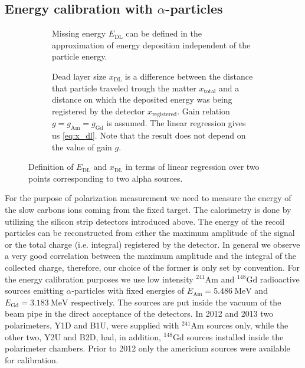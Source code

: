 \documentclass[a4paper,12pt]{article}
\newcommand\americium{${}^{241}$Am}
\newcommand\gadolinium{${}^{148}$Gd}
\begin{document}
\subsection{Energy calibration with $\alpha$-particles}

\begin{figure}[p]
\begin{subfigure}[t]{0.49\textwidth}
 \caption{Missing energy $E_\text{DL}$ can be
defined in the approximation of energy deposition independent of the particle
energy.}
\label{fig:calib_curve_naive}
\end{subfigure}
\hfill
\begin{subfigure}[t]{0.49\textwidth}

\caption{Dead layer size $x_\text{DL}$ is a difference between the distance
that particle traveled trough the matter $x_\text{total}$ and a distance on
which the deposited energy was being registered by the detector
$x_\text{registered}$.  Gain relation $g=g_\text{Am}=g_\text{Gd}$ is assumed.
The linear regression gives us \cref{eq:x_dl}.  Note that the result does not
depend on the value of gain $g$.}
\label{fig:calib_curve_smart}
\end{subfigure}
\caption{Definition of $E_\text{DL}$ and $x_\text{DL}$ in terms of linear regression
over two points corresponding to two alpha sources.}
\label{fig:calib_curves}
\end{figure}

For the purpose of polarization measurement we need to measure the energy of
the slow carbons ions coming from the fixed target. The calorimetry is done by
utilizing the silicon strip detectors introduced above.
The energy of the recoil particles
can be reconstructed from either the maximum amplitude of the signal or the
total charge (i.e. integral) registered by the detector. In general we observe
a very good correlation between the maximum amplitude and the integral of the
collected charge, therefore, our choice of the former is only set by convention.
For the energy calibration purposes we use low intensity \americium{} and \gadolinium{} radioactive
sources emitting $\alpha$-particles with fixed energies of $E_{\text{Am}} =
5.486~\text{MeV}$ and $E_{\text{Gd}} = 3.183~\text{MeV}$\cite{rytz} respectively. The
sources are put inside the vacuum of the beam pipe in the direct acceptance of the detectors. In
2012 and 2013 two polarimeters, Y1D and B1U, were supplied with \americium{}
sources only, while the other two, Y2U and B2D, had, in addition, \gadolinium{}
sources installed inside the polarimeter chambers. Prior to 2012 only the
americium sources were available for calibration.
\end{document}
